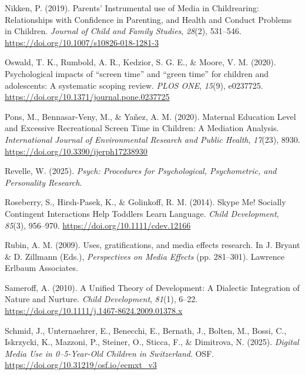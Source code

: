 \documentclass[
  man,
  floatsintext,
  longtable,
  nolmodern,
  notxfonts,
  notimes,
  colorlinks=true,linkcolor=blue,citecolor=blue,urlcolor=blue]{apa7}
\newlength{\cslhangindent}
\newenvironment{CSLReferences}[2] %
 {\begin{list}{}{%
  \setlength{\itemindent}{0pt}
  \setlength{\leftmargin}{0pt}
  \setlength{\parsep}{0pt}
  \ifodd #1
   \setlength{\leftmargin}{\cslhangindent}
   \setlength{\itemindent}{-1\cslhangindent}
  \fi
  \setlength{\itemsep}{#2\baselineskip}}}
 {\end{list}}
\begin{document}
\begin{CSLReferences}{1}{0}
Nikken, P. (2019). Parents' {Instrumental} use of {Media} in
{Childrearing}: {Relationships} with {Confidence} in {Parenting}, and
{Health} and {Conduct Problems} in {Children}. \emph{Journal of Child
and Family Studies}, \emph{28}(2), 531--546.
\url{https://doi.org/10.1007/s10826-018-1281-3}

Oswald, T. K., Rumbold, A. R., Kedzior, S. G. E., \& Moore, V. M.
(2020). Psychological impacts of {``screen time''} and {``green time''}
for children and adolescents: {A} systematic scoping review. \emph{PLOS
ONE}, \emph{15}(9), e0237725.
\url{https://doi.org/10.1371/journal.pone.0237725}

Pons, M., Bennasar-Veny, M., \& Yañez, A. M. (2020). Maternal {Education
Level} and {Excessive Recreational Screen Time} in {Children}: {A
Mediation Analysis}. \emph{International Journal of Environmental
Research and Public Health}, \emph{17}(23), 8930.
\url{https://doi.org/10.3390/ijerph17238930}

Revelle, W. (2025). \emph{Psych: {Procedures} for {Psychological},
{Psychometric}, and {Personality Research}}.

Roseberry, S., Hirsh-Pasek, K., \& Golinkoff, R. M. (2014). Skype {Me}!
{Socially Contingent Interactions Help Toddlers Learn Language}.
\emph{Child Development}, \emph{85}(3), 956--970.
\url{https://doi.org/10.1111/cdev.12166}

Rubin, A. M. (2009). Uses, gratifications, and media effects research.
In J. Bryant \& D. Zillmann (Eds.), \emph{Perspectives on {Media
Effects}} (pp. 281--301). Lawrence Erlbaum Associates.

Sameroff, A. (2010). A {Unified Theory} of {Development}: {A Dialectic
Integration} of {Nature} and {Nurture}. \emph{Child Development},
\emph{81}(1), 6--22.
\url{https://doi.org/10.1111/j.1467-8624.2009.01378.x}

Schmid, J., Unternaehrer, E., Benecchi, E., Bernath, J., Bolten, M.,
Bossi, C., Iskrzycki, K., Mazzoni, P., Steiner, O., Sticca, F., \&
Dimitrova, N. (2025). \emph{Digital {Media Use} in 0--5-{Year-Old
Children} in {Switzerland}}. OSF.
\url{https://doi.org/10.31219/osf.io/ecmxt_v3}


\end{CSLReferences}
\end{document}
